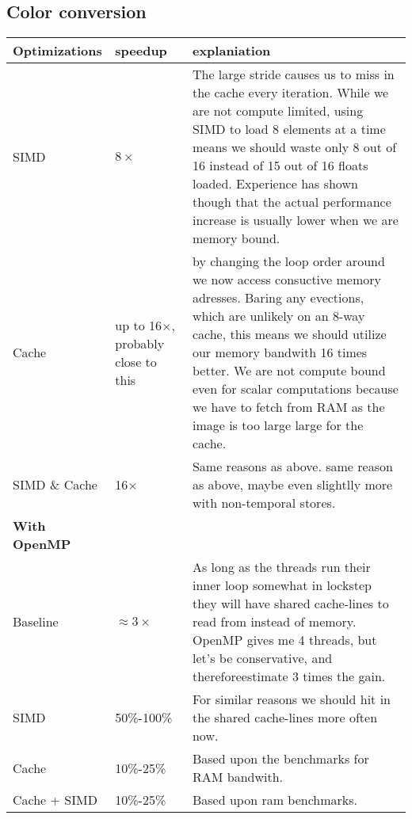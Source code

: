 \documentclass{article}
\begin{document}
\subsection{Color conversion}
\begin{tabular*}{1.1 \textwidth}{|p{}||p{}|p{}|}
  \bf Optimizations & \bf speedup & \bf explaniation \\ \hline
SIMD & $8\times$ & The large stride causes us to miss in the cache every iteration. While we are not compute limited, using SIMD to load 8 elements at a time means we should waste only 8 out of 16 instead of 15 out of 16 floats loaded. Experience has shown though that the actual performance increase is usually lower when we are memory bound.
\\ \hline Cache & up to 16$\times$, probably close to this & by changing the loop order around we now access consuctive memory adresses. Baring any evections, which are unlikely on an 8-way cache, this means we should utilize our memory bandwith 16 times better. We are not compute bound even for scalar computations because we have to fetch from RAM as the image is too large large for the cache.
\\ \hline SIMD \& Cache & 16$\times$ & Same reasons as above. same reason as above, maybe even slightlly more with non-temporal stores.
\\ \hline \bf With OpenMP &&
\\ \hline Baseline & $\approx 3\times$ & As long as the threads run their inner loop somewhat in lockstep they will have shared cache-lines to read from instead of memory. OpenMP gives me 4 threads, but let's be conservative, and thereforeestimate 3 times the gain.
\\ \hline SIMD & 50\%-100\% &  For similar reasons we should hit in the shared cache-lines more often now.
\\ \hline Cache & 10\%-25\%& Based upon the benchmarks for RAM bandwith.
\\ \hline Cache + SIMD & 10\%-25\% & Based upon ram benchmarks. \\ \hline
\end{tabular*}
\end{document}
